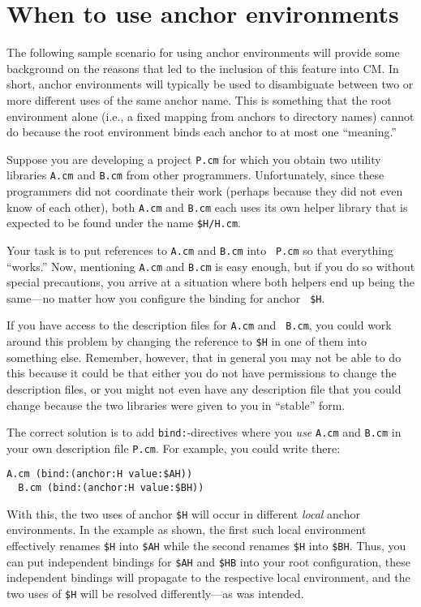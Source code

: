 \section{When to use anchor environments}

The following sample scenario for using anchor environments will
provide some background on the reasons that led to the inclusion of
this feature into CM.  In short, anchor environments will typically be
used to disambiguate between two or more different uses of the same
anchor name.  This is something that the root environment alone (i.e.,
a fixed mapping from anchors to directory names) cannot do because the
root environment binds each anchor to at most one ``meaning.''

Suppose you are developing a project {\tt P.cm} for which you obtain
two utility libraries {\tt A.cm} and {\tt B.cm} from other
programmers.  Unfortunately, since these programmers did not
coordinate their work (perhaps because they did not even know of each
other), both {\tt A.cm} and {\tt B.cm} each uses its own helper
library that is expected to be found under the name {\tt \$H/H.cm}.

Your task is to put references to {\tt A.cm} and {\tt B.cm} into {\tt
P.cm} so that everything ``works.''  Now, mentioning {\tt A.cm} and
{\tt B.cm} is easy enough, but if you do so without special
precautions, you arrive at a situation where both helpers end up being
the same---no matter how you configure the binding for anchor {\tt
\$H}.

If you have access to the description files for {\tt A.cm} and {\tt
B.cm}, you could work around this problem by changing the reference to
{\tt \$H} in one of them into something else.  Remember, however, that
in general you may not be able to do this because it could be that
either you do not have permissions to change the description files, or
you might not even have any description file that you could change
because the two libraries were given to you in ``stable'' form.

The correct solution is to add {\tt bind:}-directives where you {\em
use} {\tt A.cm} and {\tt B.cm} in your own description file {\tt P.cm}.
For example, you could write there:

\begin{lstlisting}[language=CM]
  A.cm (bind:(anchor:H value:$AH))
  B.cm (bind:(anchor:H value:$BH))
\end{lstlisting}%

With this, the two uses of anchor {\tt \$H} will occur in different
{\em local} anchor environments.  In the example as shown, the first
such local environment effectively renames {\tt \$H} into {\tt \$AH}
while the second renames {\tt \$H} into {\tt \$BH}. Thus, you can put
independent bindings for {\tt \$AH} and {\tt \$HB} into your root
configuration, these independent bindings will propagate to the
respective local environment, and the two uses of {\tt \$H} will be
resolved differently---as was intended.

